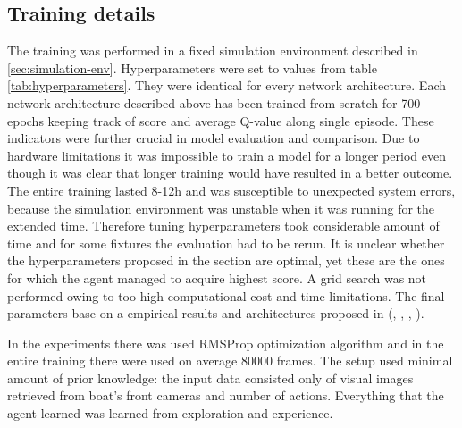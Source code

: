 \subsection{Training details}
\label{sub:training-details}

The training was performed in a fixed simulation environment described in \ref{sec:simulation-env}. Hyperparameters were set to values from
table \ref{tab:hyperparameters}. They were identical for every network architecture. Each network architecture described above has been
trained from scratch for 700 epochs keeping track of score and average Q-value along single episode. These indicators were further crucial
in model evaluation and comparison. Due to hardware limitations it was impossible to train a model for a longer period even though it was
clear that longer training would have resulted in a better outcome. The entire training lasted 8-12h and was susceptible to unexpected
system errors, because the simulation environment was unstable when it was running for the extended time. Therefore tuning hyperparameters
took considerable amount of time and for some fixtures the evaluation had to be rerun. It is unclear whether the hyperparameters proposed
in the section are optimal, yet these are the ones for which the agent managed to acquire highest score. A grid search was not performed
owing to too high computational cost and time limitations. The final parameters base on a empirical results and architectures proposed in
(\cite{DQNAtari}, \cite{2020DuckieTown}, \cite{DBLP:journals/corr/HasseltGS15}, \cite{DBLP:journals/corr/WangFL15}).

In the experiments there was used RMSProp optimization algorithm and in the entire training there were used on average 80000 frames. The setup used minimal amount of prior knowledge: the input data consisted only of visual images retrieved from boat's front cameras and number of actions. Everything that the agent learned was learned from exploration and experience.
